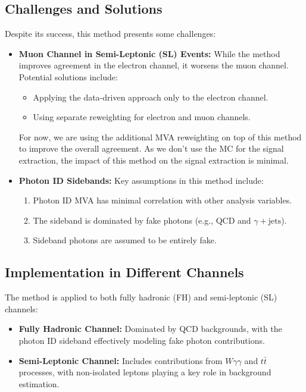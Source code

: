 \subsection{Challenges and Solutions}
Despite its success, this method presents some challenges:
\begin{itemize}
    \item \textbf{Muon Channel in Semi-Leptonic (SL) Events:}
    While the method improves agreement in the electron channel, it worsens the muon channel.
    Potential solutions include:
    \begin{itemize}
        \item Applying the data-driven approach only to the electron channel.
        \item Using separate reweighting for electron and muon channels.
    \end{itemize}
    For now, we are using the additional MVA reweighting on top of this method to improve the overall agreement. As we don't use the MC for the signal extraction, the impact of this method on the signal extraction is minimal.

    \item \textbf{Photon ID Sidebands:}
    Key assumptions in this method include:
    \begin{enumerate}
        \item Photon ID MVA has minimal correlation with other analysis variables.
        \item The sideband is dominated by fake photons (e.g., QCD and \(\gamma + \text{jets}\)).
        \item Sideband photons are assumed to be entirely fake.
    \end{enumerate}
\end{itemize}

\subsection{Implementation in Different Channels}
The method is applied to both fully hadronic (FH) and semi-leptonic (SL) channels:
\begin{itemize}
    \item \textbf{Fully Hadronic Channel:}
    Dominated by QCD backgrounds, with the photon ID sideband effectively modeling fake photon contributions.
    \item \textbf{Semi-Leptonic Channel:}
    Includes contributions from \(W\gamma\gamma\) and \(t\bar{t}\) processes, with non-isolated leptons playing a key role in background estimation.
\end{itemize}

